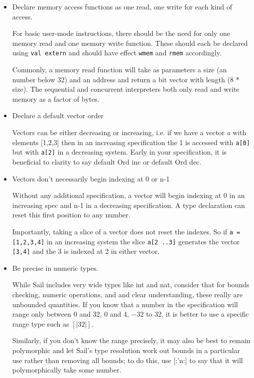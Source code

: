 \documentclass[11pt]{article}
\begin{document}
\begin{itemize}

\item Declare memory access functions as one read, one write for each
  kind of access.

For basic user-mode instructions, there should be the need for only
one memory read and one memory write function. These should each be
declared using {\tt val extern} and should have effect {\tt wmem} and
{\tt rmem} accordingly. 

Commonly, a memory read function will take as parameters a size (an
number below 32) and an address and return a bit vector with length (8
* size). The sequential and concurrent interpreters both only read and
write memory as a factor of bytes.

\item Declare a default vector order

Vectors can be either decreasing or increasing, i.e. if we have a
vector \emph{a} with elements [1,2,3] then in an increasing specification the 1 is accessed
with {\tt a[0]} but with {\tt a[2]} in a decreasing system. Early in
your specification, it is beneficial to clarity to say default Ord inc
or default Ord dec.

\item Vectors don't necessarily begin indexing at 0 or n-1

Without any additional specification, a vector will begin indexing at
0 in an increasing spec and n-1 in a decreasing specification. A type
declaration can reset this first position to any number. 

Importantly, taking a slice of a vector does not reset the indexes. So
if {\tt a = [1,2,3,4]} in an increasing system the slice {\tt a[2
  ..3]} generates the vector {\tt [3,4]} and the 3 is indexed at 2 in either vector.

\item Be precise in numeric types. 

While Sail includes very wide types like int and nat, consider that
for bounds checking, numeric operations, and and clear understanding,
these really are unbounded quantities. If you know that a number in
the specification will range only between 0 and 32, 0 and 4, $-32$ to
32, it is better to use a specific range type such as $[|32|]$. 

Similarly, if you don't know the range precisely, it may also be best
to remain polymorphic and let Sail's type resolution work out bounds
in a particular use rather than removing all bounds; to do this, use
[:'n:] to say that it will polymorphically take some number.


\end{itemize}
\end{document}
